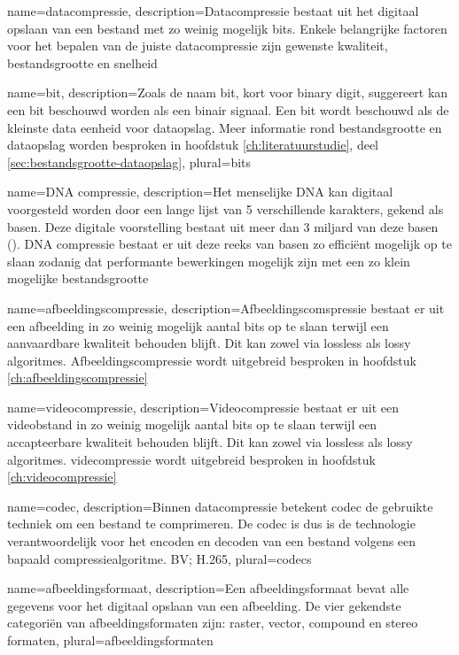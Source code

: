 {
	name={datacompressie},
	description={Datacompressie bestaat uit het digitaal opslaan van een bestand met zo weinig mogelijk bits. Enkele belangrijke factoren voor het bepalen van de juiste datacompressie zijn gewenste kwaliteit, bestandsgrootte en snelheid}
}

{
	name={bit},
	description={Zoals de naam bit, kort voor binary digit, suggereert kan een bit beschouwd worden als een binair signaal. Een bit wordt beschouwd als de kleinste data eenheid voor dataopslag. Meer informatie rond bestandsgrootte en dataopslag worden besproken in hoofdstuk \ref{ch:literatuurstudie}, deel \ref{sec:bestandsgrootte-dataopslag}},
	plural={bits}
}

{
	name={DNA compressie},
	description={Het menselijke DNA kan digitaal voorgesteld worden door een lange lijst van 5 verschillende karakters, gekend als basen. Deze digitale voorstelling bestaat uit meer dan 3 miljard van deze basen (\cite{dodanaugent2011}). DNA compressie bestaat er uit deze reeks van basen zo efficiënt mogelijk op te slaan zodanig dat performante bewerkingen mogelijk zijn met een zo klein mogelijke bestandsgrootte}
}

{
	name={afbeeldingscompressie},
	description={Afbeeldingscomspressie bestaat er uit een afbeelding in zo weinig mogelijk aantal bits op te slaan terwijl een aanvaardbare kwaliteit behouden blijft. Dit kan zowel via lossless als lossy algoritmes. Afbeeldingscompressie wordt uitgebreid besproken in hoofdstuk \ref{ch:afbeeldingscompressie}}
}

{
	name={videocompressie},
	description={Videocompressie bestaat er uit een videobstand in zo weinig mogelijk aantal bits op te slaan terwijl een accapteerbare kwaliteit behouden blijft. Dit kan zowel via lossless als lossy algoritmes. videcompressie wordt uitgebreid besproken in hoofdstuk \ref{ch:videocompressie}}
}

{
	name={codec},
	description={Binnen datacompressie betekent codec de gebruikte techniek om een bestand te comprimeren. De codec is dus is de technologie verantwoordelijk voor het encoden en decoden van een bestand volgens een bapaald compressiealgoritme. BV; H.265},
	plural={codecs}
}

{
	name={afbeeldingsformaat},
	description={Een afbeeldingsformaat bevat alle gegevens voor het digitaal opslaan van een afbeelding. De vier gekendste categoriën van afbeeldingsformaten zijn: raster, vector, compound en stereo formaten},
	plural={afbeeldingsformaten}
}

